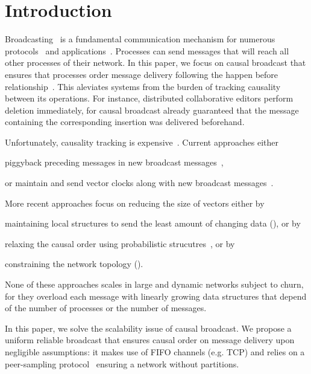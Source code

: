 
\section{Introduction}


Broadcasting~\cite{hadzilacos1994modular} is a fundamental communication
mechanism for numerous protocols~\cite{shapiro2011comprehensive} and
applications~\cite{nedelec2016crate}. Processes can send messages that will
reach all other processes of their network. In this paper, we focus on causal
broadcast that ensures that processes order message delivery following the
happen before relationship~\cite{lamport1978time}. This aleviates systems from
the burden of tracking causality between its operations. For instance,
distributed collaborative editors perform deletion immediately, for causal
broadcast already guaranteed that the message containing the corresponding
insertion was delivered beforehand.

Unfortunately, causality tracking is
expensive~\cite{charronbost1991concerning}. Current approaches either
\begin{inparaenum}[(i)]
\item piggyback preceding messages in new broadcast
  messages~\cite{birman1987reliable,hadzilacos1993fault},
\item or maintain and send vector clocks along with new broadcast
  messages~\cite{fidge1988timestamps,mattern1989virtual}.
\end{inparaenum}
More recent approaches focus on reducing the size of vectors either by
\begin{inparaenum}[(a)]
\item maintaining local structures to send the least amount of changing data
  (\REF), or by
\item relaxing the causal order using probabilistic
  strucutres~\cite{mostefaoui2017probabilistic}, or by
\item constraining the network topology (\REF).
\end{inparaenum}
None of these approaches scales in large and dynamic networks subject to churn,
for they overload each message with linearly growing data structures that depend
of the number of processes or the number of messages.

In this paper, we solve the scalability issue of causal broadcast. We propose a
uniform reliable broadcast that ensures causal order on message delivery upon
negligible assumptions: it makes use of FIFO channels (e.g. TCP) and relies on a
peer-sampling protocol~\cite{jelasity2007gossip} ensuring a network without
partitions. 


